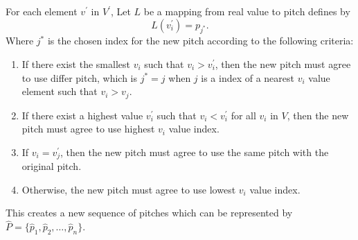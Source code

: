 \documentclass[11pt]{article}
\begin{document}
For each element $v^\prime$ in $V^\prime$, Let $L$ be a mapping from real value to pitch defines by 
$$L(v^\prime_i) = p_{j^*}.$$ 
Where $j^*$ is the chosen index for the new pitch according to the following criteria:
\begin{enumerate}
	\item If there exist the smallest $v_i$ such that $v_i > v^\prime_i$, then the new pitch must agree to use differ pitch, which is $j^* = j$ when $j$ is a index of a nearest $v_i$ value element such that $v_i > v_j$.
	\item If there exist a highest value $v^\prime_i$ such that $v_i < v^\prime_i$ for all $v_i$ in $V$, then the new pitch must agree to use highest $v_i$ value index. 
	\item If $v_i = v^\prime_j$, then the new pitch must agree to use the same pitch with the original pitch. 
	\item Otherwise, the new pitch must agree to use lowest $v_i$ value index.
\end{enumerate}
This creates a new sequence of pitches which can be represented by $\hat{P} =\{ \hat{p}_1, \hat{p}_2, \dots, \hat{p}_n \}$.
\end{document}
